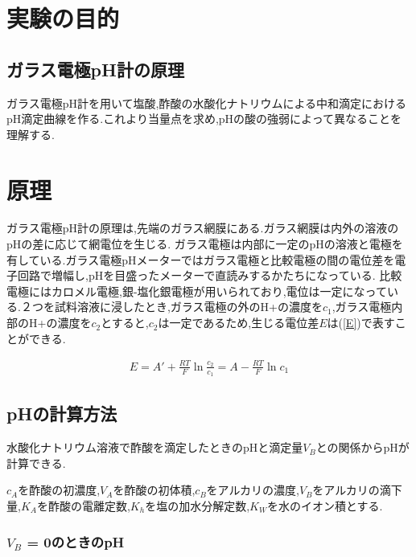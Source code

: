 \documentclass[a4j,10pt,dvipdfmx]{jarticle}
\begin{document}
\section{実験の目的}
\subsection{ガラス電極pH計の原理}
ガラス電極pH計を用いて塩酸,酢酸の水酸化ナトリウムによる中和滴定におけるpH滴定曲線を作る.これより当量点を求め,pHの酸の強弱によって異なることを理解する.
\section{原理}
ガラス電極pH計の原理は,先端のガラス網膜にある.ガラス網膜は内外の溶液のpHの差に応じて網電位を生じる.
ガラス電極は内部に一定のpHの溶液と電極を有している.ガラス電極pHメーターではガラス電極と比較電極の間の電位差を電子回路で増幅し,pHを目盛ったメーターで直読みするかたちになっている.
比較電極にはカロメル電極,銀-塩化銀電極が用いられており,電位は一定になっている.２つを試料溶液に浸したとき,ガラス電極の外のH+の濃度を$c_1$,ガラス電極内部のH+の濃度を$c_2$とすると,$c_2$は一定であるため,生じる電位差$E$は(\ref{E})で表すことができる.

\begin{eqnarray}
  \label{E}
  E = A' + \frac{RT}{F}\ln\frac{c_2}{c_1} = A - \frac{RT}{F}\ln{c_1}
\end{eqnarray}

\subsection{pHの計算方法}
水酸化ナトリウム溶液で酢酸を滴定したときのpHと滴定量$V_B$との関係からpHが計算できる.

$c_A$を酢酸の初濃度,$V_A$を酢酸の初体積,$c_B$をアルカリの濃度,$V_B$をアルカリの滴下量,$K_A$を酢酸の電離定数,$K_h$を塩の加水分解定数,$K_W$を水のイオン積とする.


\subsubsection{$V_B$ = 0のときのpH}
\end{document}

